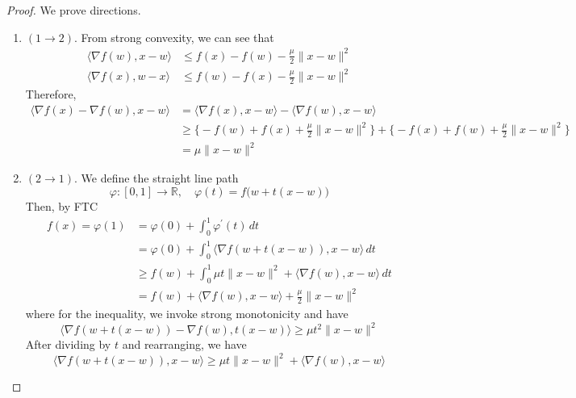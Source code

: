 	\begin{proof}
	  We prove directions. 
		\begin{enumerate}
		  \item $(1 \rightarrow 2)$. From strong convexity, we can see that 
				\begin{align}
					\langle \nabla f(w), x - w \rangle & \leq f(x) - f(w) - \frac{\mu}{2} \|x - w\|^2 \\ 
					\langle \nabla f(x), w - x \rangle & \leq f(w) - f(x) - \frac{\mu}{2} \|x - w\|^2
				\end{align}
				Therefore, 
				\begin{align}
					\langle \nabla f(x) - \nabla f(w), x - w \rangle 
						& = \langle \nabla f(x), x - w \rangle - \langle \nabla f(w), x - w \rangle \\ 
						& \geq \big\{ -f(w) + f(x) + \frac{\mu}{2} \|x - w\|^2 \big\} + \big\{ - f(x) + f(w) + \frac{\mu}{2} \| x - w\|^2 \big\} \\ 
						& = \mu \|x - w\|^2
				\end{align}

			\item $(2 \rightarrow 1)$. We define the straight line path 
				\begin{equation}
					\varphi: [0, 1] \to \mathbb{R}, \quad \varphi(t) = f\big( w + t(x - w) \big)
				\end{equation}
				Then, by FTC
				\begin{align}
					f(x) = \varphi(1) & = \varphi(0) + \int_0^1 \varphi^\prime (t) \,dt \\ 
														& = \varphi(0) + \int_0^1 \langle \nabla f(w + t(x - w)), x - w \rangle \,dt  \\ 
														& \geq  f(w) + \int_0^1 \mu t \|x - w\|^2 + \langle \nabla f(w), x - w \rangle \,dt \\
														& = f(w) + \langle \nabla f(w), x - w \rangle + \frac{\mu}{2} \|x - w\|^2
				\end{align}
				where for the inequality, we invoke strong monotonicity and have 
				\begin{equation}
				  \langle \nabla f(w + t(x - w)) - \nabla f(w), t (x - w) \rangle \geq \mu t^2 \|x - w\|^2
				\end{equation}
				After dividing by $t$ and rearranging, we have 
				\begin{equation}
				  \langle \nabla f(w + t(x - w)), x - w \rangle \geq \mu t \|x - w\|^2 + \langle \nabla f(w), x - w \rangle
				\end{equation}


\end{enumerate}
\end{proof}
